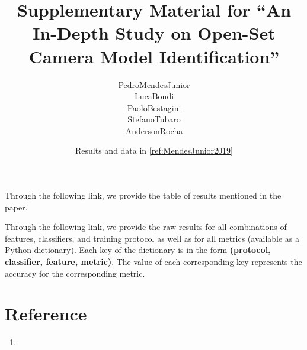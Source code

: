

% 

\renewcommand\highlightauthorname[1]{#1}

\title{{Supplementary Material for ``An In-Depth Study on Open-Set Camera Model Identification''}}
\author{\gls{PedroMendesJunior}\\%
  \gls{LucaBondi}\\%
  \gls{PaoloBestagini}\\%
  \gls{StefanoTubaro}\\%
  \gls{AndersonRocha}\\%
}
\date{Results and data in \ref{ref:MendesJunior2019}}



\maketitle


Through the following link, we provide the table of results mentioned in the paper.

\begin{center}
\end{center}

Through the following link, we provide the raw results for all combinations of features, classifiers, and training protocol as well as for all metrics (available as a Python dictionary).
Each key of the dictionary is in the form \textbf{(protocol, classifier, feature, metric)}. The value of each corresponding key represents the accuracy for the corresponding metric.

\begin{center}
\end{center}

\section*{Reference}

\begin{enumerate}
\item{}
\end{enumerate}




